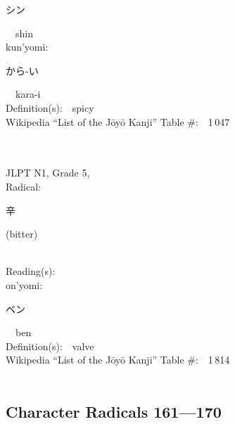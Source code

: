 \begin{multicols}{2}
{\hspace*{2em}}{\begin{CJK}{UTF8}{min} シン \end{CJK}}\ \ shin\ \ \\
{\hspace*{1em}}kun'yomi:\ \ \\
{\hspace*{2em}}{\begin{CJK}{UTF8}{min} から-い \end{CJK}}\ \ kara-i\ \ \\
Definition(s):\ \ spicy \\
Wikipedia ``List of the J\=oy\=o Kanji'' Table \#:\ \ 1\,047 \\
\ \ \\
{\fontsize{34pt}{40pt}  }\ \ \\  %
{JLPT N1, Grade 5, \\Radical:\ \ {\begin{CJK}{UTF8}{min} 辛 \end{CJK}} (bitter) } \\
Reading(s):\ \ \\
{\hspace*{1em}}on'yomi:\ \ \\
{\hspace*{2em}}{\begin{CJK}{UTF8}{min} ベン \end{CJK}}\ \ ben\ \ \\
Definition(s):\ \ valve \\
Wikipedia ``List of the J\=oy\=o Kanji'' Table \#:\ \ 1\,814 \\
\ \ \\
\end{multicols}



\newpage



\subsection*{Character Radicals 161---170 }
  \label{P3-S18}

